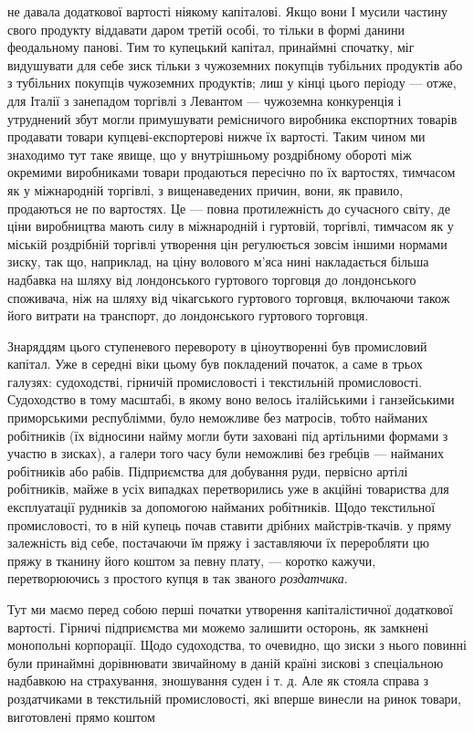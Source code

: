 \parcont{}  %
не давала додаткової вартості ніякому капіталові. Якщо вони І мусили частину свого продукту віддавати даром третій особі, то
тільки в формі данини феодальному панові. Тим то купецький капітал, принаймні спочатку, міг видушувати для себе зиск тільки
з чужоземних покупців тубільних продуктів або з тубільних покупців чужоземних продуктів; лиш у кінці цього періоду — отже,
для Італії з занепадом торгівлі з Левантом — чужоземна конкуренція і утруднений збут могли примушувати ремісничого виробника
експортних товарів продавати товари купцеві-експортерові нижче їх вартості. Таким чином ми знаходимо тут таке явище, що у
внутрішньому роздрібному обороті між окремими виробниками товари продаються пересічно по їх вартостях, тимчасом як у
міжнародній торгівлі, з вищенаведених причин, вони, як правило, продаються не по вартостях. Це — повна протилежність до
сучасного світу, де ціни виробництва мають силу в міжнародній і гуртовій, торгівлі, тимчасом як у міській роздрібній
торгівлі утворення цін регулюється зовсім іншими нормами зиску, так що, наприклад, на ціну волового м’яса нині накладається
більша надбавка на шляху від лондонського гуртового торговця до лондонського споживача, ніж на шляху від чікагського
гуртового торговця, включаючи також його витрати на транспорт, до лондонського гуртового торговця.

Знаряддям цього
ступеневого перевороту в ціноутворенні був промисловий капітал. Уже в середні віки цьому був покладений початок, а саме в
трьох галузях: судоходстві, гірничій промисловості і текстильній промисловості. Судоходство в тому масштабі, в якому воно
велось італійськими і ганзейськими приморськими республімми, було неможливе без матросів, тобто найманих робітників (їх
відносини найму могли бути заховані під артільними формами з участю в зисках), а галери того часу були неможливі без гребців
— найманих робітників або рабів. Підприємства для добування руди, первісно артілі робітників, майже в усіх випадках
перетворились уже в акційні товариства для експлуатації рудників за допомогою найманих робітників. Щодо текстильної
промисловості, то в ній купець почав ставити дрібних майстрів-ткачів. у пряму залежність від себе, постачаючи їм пряжу і
заставляючи їх переробляти цю пряжу в тканину його коштом за певну плату, — коротко кажучи, перетворюючись з простого купця
в так званого \emph{роздатчика}.

Тут ми маємо перед собою перші початки утворення капіталістичної додаткової вартості. Гірничі
підприємства ми можемо залишити осторонь, як замкнені монопольні корпорації. Щодо судоходства, то очевидно, що зиски з нього
повинні були принаймні дорівнювати звичайному в даній країні зискові з спеціальною надбавкою на страхування, зношування
суден і т. д. Але як стояла справа з роздатчиками в текстильній промисловості, які вперше винесли на ринок товари,
виготовлені прямо коштом
\parbreak{}  %

